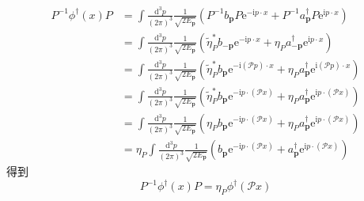\begin{equation}
    \begin{aligned}
        P^{-1}\phi ^{\dagger}(x)P&=\int{\frac{\mathrm{d}^3p}{\left( 2\pi \right) ^3}}\frac{1}{\sqrt{2E_{\mathbf{p}}}}\left( P^{-1}b_{\mathbf{p}}P\mathrm{e}^{-\mathrm{i}p\cdot x}+P^{-1}a_{\mathbf{p}}^{\dagger}P\mathrm{e}^{\mathrm{i}p\cdot x} \right) 
\\
&=\int{\frac{\mathrm{d}^3p}{\left( 2\pi \right) ^3}}\frac{1}{\sqrt{2E_{\mathbf{p}}}}\left( \tilde{\eta}_{P}^{*}b_{-\mathbf{p}}\mathrm{e}^{-\mathrm{i}p\cdot x}+\eta _Pa_{-\mathbf{p}}^{\dagger}\mathrm{e}^{\mathrm{i}p\cdot x} \right) 
\\
&=\int{\frac{\mathrm{d}^3p}{\left( 2\pi \right) ^3}}\frac{1}{\sqrt{2E_{\mathbf{p}}}}\left( \tilde{\eta}_{P}^{*}b_{\mathbf{p}}\mathrm{e}^{-\mathrm{i}\left( \mathcal{P} p \right) \cdot x}+\eta _Pa_{\mathbf{p}}^{\dagger}\mathrm{e}^{\mathrm{i}\left( \mathcal{P} p \right) \cdot x} \right) 
\\
&=\int{\frac{\mathrm{d}^3p}{\left( 2\pi \right) ^3}}\frac{1}{\sqrt{2E_{\mathbf{p}}}}\left( \tilde{\eta}_{P}^{*}b_{\mathbf{p}}\mathrm{e}^{-\mathrm{i}p\cdot \left( \mathcal{P} x \right)}+\eta _Pa_{\mathbf{p}}^{\dagger}\mathrm{e}^{\mathrm{i}p\cdot \left( \mathcal{P} x \right)} \right) 
\\
&=\int{\frac{\mathrm{d}^3p}{\left( 2\pi \right) ^3}}\frac{1}{\sqrt{2E_{\mathbf{p}}}}\left( \eta _Pb_{\mathbf{p}}\mathrm{e}^{-\mathrm{i}p\cdot \left( \mathcal{P} x \right)}+\eta _Pa_{\mathbf{p}}^{\dagger}\mathrm{e}^{\mathrm{i}p\cdot \left( \mathcal{P} x \right)} \right) 
\\
&=\eta _P\int{\frac{\mathrm{d}^3p}{\left( 2\pi \right) ^3}}\frac{1}{\sqrt{2E_{\mathbf{p}}}}\left( b_{\mathbf{p}}\mathrm{e}^{-\mathrm{i}p\cdot \left( \mathcal{P} x \right)}+a_{\mathbf{p}}^{\dagger}\mathrm{e}^{\mathrm{i}p\cdot \left( \mathcal{P} x \right)} \right) 
    \end{aligned}
\end{equation}
得到
\begin{equation}
    P^{-1}\phi ^{\dagger}(x)P=\eta _P\phi ^{\dagger}(\mathcal{P} x)
\end{equation}

